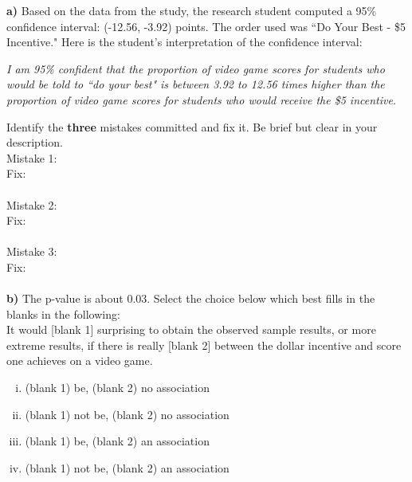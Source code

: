 \documentclass[12pt, oneside]{article}
\newcommand{\noi}{\noindent}
\begin{document}
\noi
{\bf a)} Based on the data from the study, the research student computed a 95\% confidence interval: (-12.56, -3.92) points. The order used was ``Do Your Best - \$5 Incentive." Here is the student's interpretation of the confidence interval:\\
\begin{center}
\emph{I am 95\% confident that the proportion of video game scores for students who would be told to ``do your best" is between 3.92 to 12.56 times higher than the proportion of video game scores for students who would receive the \$5 incentive.}
\end{center}

\noi
Identify the {\bf three} mistakes committed and fix it.  Be brief but clear in your description.\\

\vspace{.15in}
\noi
Mistake 1: \underline{\hspace{6in}} \\

Fix: \underline{\hspace{4in}}\\
\\
\noi
Mistake 2: \underline{\hspace{6in}} \\

Fix: \underline{\hspace{4in}}\\
\\
\noi
Mistake 3: \underline{\hspace{6in}} \\

Fix: \underline{\hspace{4in}}\\
\\

\noi
{\bf b)} The p-value is about 0.03. Select the choice below which best fills in the blanks in the following:\\

\noi
It would [blank 1] surprising to obtain the observed sample results, or more extreme results, if there is really [blank 2] between the dollar incentive and score one achieves on a video game.
\begin{enumerate} [(i)]
\item (blank 1) be, (blank 2) no association
\item (blank 1) not be, (blank 2) no association
\item (blank 1) be, (blank 2) an association
\item (blank 1) not be, (blank 2) an association
\end{enumerate}
\vspace{.15in}
\end{document}
